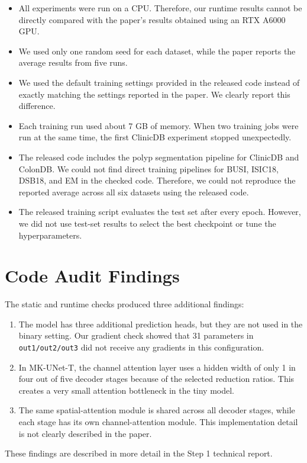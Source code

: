 \documentclass[10pt,a4paper]{article}
\begin{document}
\begin{itemize}
\item All experiments were run on a CPU. Therefore, our runtime results cannot be directly compared with the paper's results obtained using an RTX A6000 GPU.

\item We used only one random seed for each dataset, while the paper reports the average results from five runs.

\item We used the default training settings provided in the released code instead of exactly matching the settings reported in the paper. We clearly report this difference.

\item Each training run used about 7 GB of memory. When two training jobs were run at the same time, the first ClinicDB experiment stopped unexpectedly.

\item The released code includes the polyp segmentation pipeline for ClinicDB and ColonDB. We could not find direct training pipelines for BUSI, ISIC18, DSB18, and EM in the checked code. Therefore, we could not reproduce the reported average across all six datasets using the released code.

\item The released training script evaluates the test set after every epoch. However, we did not use test-set results to select the best checkpoint or tune the hyperparameters.
\end{itemize}

\section{Code Audit Findings}

The static and runtime checks produced three additional findings:

\begin{enumerate}
\item The model has three additional prediction heads, but they are not used in the binary setting. Our gradient check showed that 31 parameters in \texttt{out1/out2/out3} did not receive any gradients in this configuration.

\item In MK-UNet-T, the channel attention layer uses a hidden width of only 1 in four out of five decoder stages because of the selected reduction ratios. This creates a very small attention bottleneck in the tiny model.

\item The same spatial-attention module is shared across all decoder stages, while each stage has its own channel-attention module. This implementation detail is not clearly described in the paper.
\end{enumerate}

These findings are described in more detail in the Step 1 technical report.
\end{document}
